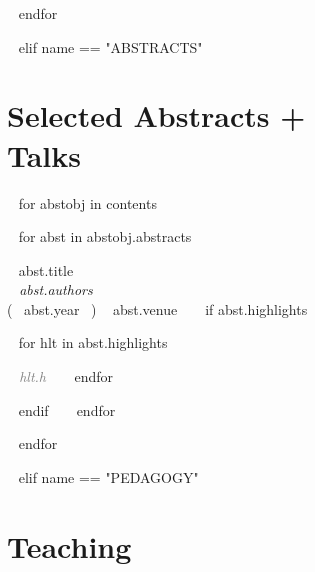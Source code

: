 ~{ endfor }~





~{ elif name == "ABSTRACTS" }~

\section{Selected Abstracts +  \\Talks}

~{ for abstobj in contents }~ 
\begin{etaremune}[itemindent=-\bibhang, topsep=0pt,
				   itemsep=\bibsep,partopsep=0pt,parsep=0pt,leftmargin={\bibhang+\widthof{[999]}}] 
    ~{ for abst in abstobj.abstracts  }~
    \item ~{{ abst.title }}~ \\
     \textit{~{{ abst.authors }}~}\\
     (~{{ abst.year }}~) ~{{ abst.venue }}~
     ~{ if abst.highlights }~
     	\begin{innerlist}
     	~{ for hlt in abst.highlights }~
	     \item  \textcolor{grey}{\textit{~{{ hlt.h }}~} }
     	~{ endfor }~
     	\end{innerlist}
     ~{ endif }~
	~{ endfor }~


\end{etaremune}
~{ endfor }~




~{ elif name == "PEDAGOGY" }~

\section{Teaching}

